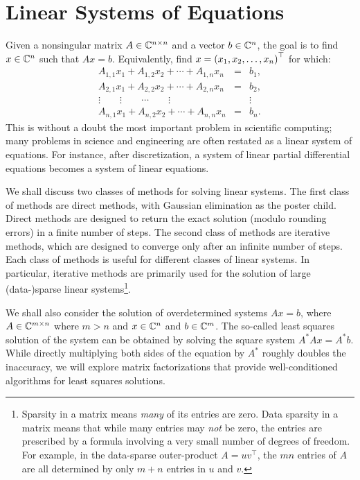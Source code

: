 \chapter{Linear Systems of Equations}\label{chapter:LinearSystems}

Given a nonsingular matrix $A\in\mathbb{C}^{n\times n}$ and a vector $b\in\mathbb{C}^n$, the goal is to find $x\in\mathbb{C}^n$ such that $Ax=b$. Equivalently, find $x=\pr(x_1,x_2,\ldots,x_n)^\top$ for which:
\begin{equation}
\begin{array}{ccc}
A_{1,1}x_1 + A_{1,2}x_2+\cdots+A_{1,n}x_n & = & b_1,\\
A_{2,1}x_1 + A_{2,2}x_2+\cdots+A_{2,n}x_n & = & b_2,\\
\vdots \qquad \vdots \qquad \cdots \qquad \vdots & & \vdots \\
A_{n,1}x_1 + A_{n,2}x_2+\cdots+A_{n,n}x_n & = & b_n.
\end{array}
\end{equation}
This is without a doubt the most important problem in scientific computing; many problems in science and engineering are often restated as a linear system of equations. For instance, after discretization, a system of linear partial differential equations becomes a system of linear equations.

We shall discuss two classes of methods for solving linear systems. The first class of methods are direct methods, with Gaussian elimination as the poster child. Direct methods are designed to return the exact solution (modulo rounding errors) in a finite number of steps. The second class of methods are iterative methods, which are designed to converge only after an infinite number of steps. Each class of methods is useful for different classes of linear systems. In particular, iterative methods are primarily used for the solution of large (data-)sparse linear systems\footnote{Sparsity in a matrix means {\em many} of its entries are zero. Data sparsity in a matrix means that while many entries may {\em not} be zero, the entries are prescribed by a formula involving a very small number of degrees of freedom. For example, in the data-sparse outer-product $A=uv^\top$, the $mn$ entries of $A$ are all determined by only $m+n$ entries in $u$ and $v$.}.

We shall also consider the solution of overdetermined systems $Ax=b$, where $A\in\mathbb{C}^{m\times n}$ where $m>n$ and $x\in\mathbb{C}^n$ and $b\in\mathbb{C}^m$. The so-called least squares solution of the system can be obtained by solving the square system $A^* Ax = A^* b$. While directly multiplying both sides of the equation by $A^*$ roughly doubles the inaccuracy, we will explore matrix factorizations that provide well-conditioned algorithms for least squares solutions.

